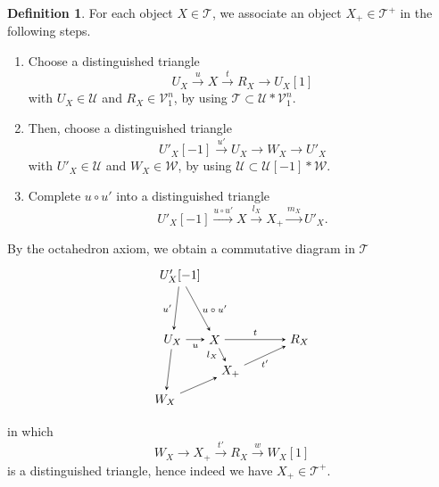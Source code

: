 \documentclass[a4paper,reqno,10pt]{amsart}
\theoremstyle{definition}
\newtheorem{definition}[definition]{Definition}
\theoremstyle{definition}
\theoremstyle{definition}
\theoremstyle{definition}
\theoremstyle{plain}
\newcommand{\CT}{\mathcal{T}}
\newcommand{\CU}{\mathcal{U}}
\newcommand{\CV}{\mathcal{V}}
\newcommand{\CW}{\mathcal{W}}
\begin{document}
\begin{definition}\label{def:functor_+}
For each object $X\in\CT$, we associate an object $X_+\in\CT^+$ in the following steps.
\begin{enumerate}
\renewcommand{\labelenumi}{(\roman{enumi})} 
\item Choose a distinguished triangle 
\begin{equation}\label{triangle_i}
U_X\xrightarrow{u}X\xrightarrow{t}R_X\to U_X[1]
\end{equation}
with $U_X\in\CU$ and $R_X\in\CV_1^n$, by using $\CT\subset\CU\ast\CV_1^n$.
\item Then, choose a distinguished triangle
\begin{equation}\label{triangle_ii}
U'_X[-1]\xrightarrow{u'} U_X\to W_X\to U'_X
\end{equation}
with $U'_X\in\CU$ and $W_X\in\CW$, by using $\CU\subset\CU[-1]\ast\CW$.
\item Complete $u\circ u'$ into a distinguished triangle
\begin{equation}\label{triangle_iii}
U'_X[-1]\xrightarrow{u\circ u'} X\xrightarrow{l_X} X_+\xrightarrow{m_X} U'_X.
\end{equation}
\end{enumerate}
By the octahedron axiom, we obtain a commutative diagram in $\CT$
\[
\begin{tikzpicture}[>=stealth]
\node (1) at (-0.98,1.8) {$U'_X[-1]$};
\node (2) at (-1.19,0) {$U_X$};
\node (3) at (-1.4,-1.7) {$W_X$};
\node (4) at (0,0) {$X$};
\node (5) at (0.45,-0.9) {$X_+$};
\node (6) at (2.4,0) {$R_X$};
\draw[->] (1) -- node[left,font=\scriptsize] {$u'$} (2);
\draw[->] (1) -- node[right,font=\scriptsize] {$u\circ u'$} (4);
\draw[->] (2) -- (3);
\draw[->] (2) -- node[below,font=\scriptsize] {$u$} (4);
\draw[->] (3) -- (5);
\draw[->] (4) -- node[left,font=\scriptsize] {$l_X$} (5);
\draw[->] (4) -- node[above,font=\scriptsize] {$t$} (6);
\draw[->] (5) -- node[below,font=\scriptsize] {$t'$} (6);
\end{tikzpicture}
\]
in which 
\begin{equation}\label{triangle_iv}
W_X\to X_+\xrightarrow{t'} R_X\xrightarrow{w} W_X[1]
\end{equation}
is a distinguished triangle, hence indeed we have $X_+\in\CT^+$.
\end{definition}
\end{document}
